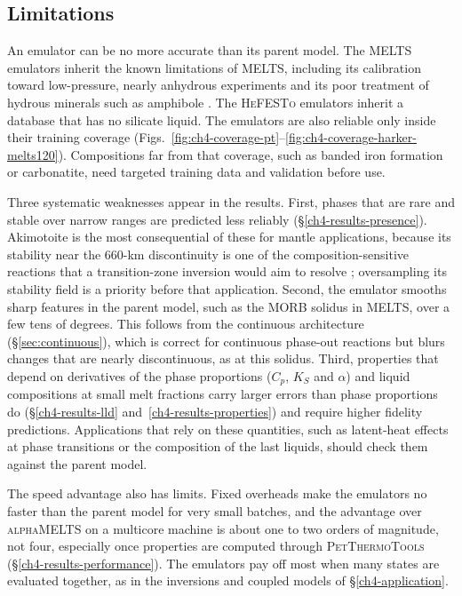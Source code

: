 \subsection{Limitations}\label{ch4-discussion-limitations}

An emulator can be no more accurate than its parent model. The \textsc{MELTS} emulators inherit the known limitations of
\textsc{MELTS}, including its calibration toward low-pressure, nearly anhydrous experiments \citep{ghiorsosack1995} and its poor
treatment of hydrous minerals such as amphibole \citep{candioti2026}. The \textsc{HeFESTo} emulators inherit a database that has no
silicate liquid. The emulators are also reliable only inside their training coverage
(Figs.~\ref{fig:ch4-coverage-pt}--\ref{fig:ch4-coverage-harker-melts120}). Compositions far from that coverage, such as banded iron
formation or carbonatite, need targeted training data and validation before use.

Three systematic weaknesses appear in the results. First, phases that are rare and stable over narrow ranges are predicted less
reliably (\S\ref{ch4-results-presence}). Akimotoite is the most consequential of these for mantle applications, because its stability
near the 660-km discontinuity is one of the composition-sensitive reactions that a transition-zone inversion would aim to resolve
\citep{hartmeier2026}; oversampling its stability field is a priority before that application. Second, the emulator smooths sharp features 
in the parent model, such as the MORB solidus in \textsc{MELTS}, over a few tens of degrees. This follows from the
continuous architecture (\S\ref{sec:continuous}), which is correct for continuous phase-out reactions but blurs changes that are nearly
discontinuous, as at this solidus. Third, properties that depend on derivatives of the phase proportions ($C_p$, $K_S$
and $\alpha$) and liquid compositions at small melt fractions carry larger errors than phase proportions do
(\S\ref{ch4-results-lld} and~\ref{ch4-results-properties}) and require higher fidelity predictions. Applications that rely on these quantities, such as latent-heat
effects at phase transitions or the composition of the last liquids, should check them against the parent model.

The speed advantage also has limits. Fixed overheads make the emulators no faster than the parent model for very small batches,
and the advantage over \textsc{alphaMELTS} on a multicore machine is about one to two orders of magnitude, not four, especially once
properties are computed through \textsc{PetThermoTools} (\S\ref{ch4-results-performance}). The emulators pay off most when many
states are evaluated together, as in the inversions and coupled models of \S\ref{ch4-application}.

